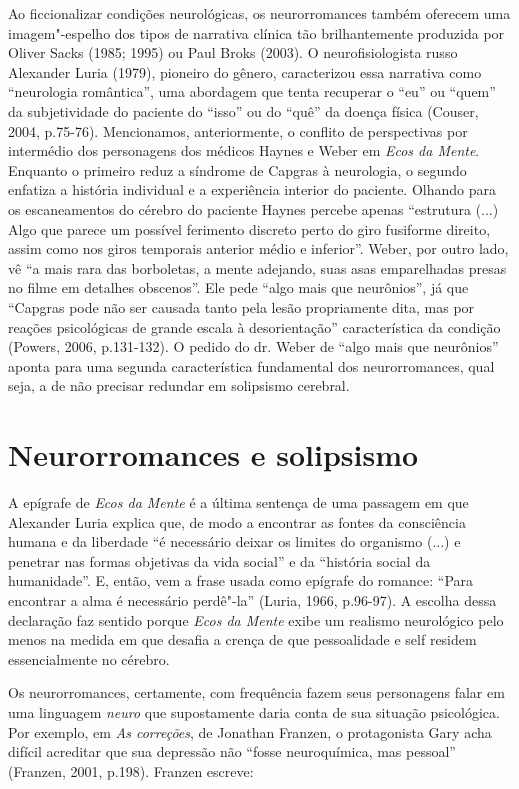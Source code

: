 Ao ficcionalizar condições neurológicas, os neurorromances também
oferecem uma imagem"-espelho dos tipos de narrativa clínica tão
brilhantemente produzida por Oliver Sacks (1985; 1995) ou Paul Broks
(2003). O neurofisiologista russo Alexander Luria (1979), pioneiro do
gênero, caracterizou essa narrativa como ``neurologia romântica'', uma
abordagem que tenta recuperar o ``eu'' ou ``quem'' da subjetividade do
paciente do ``isso'' ou do ``quê'' da doença física (Couser, 2004,
p.75-76). Mencionamos, anteriormente, o conflito de perspectivas por
intermédio dos personagens dos médicos Haynes e Weber em \emph{Ecos da
Mente}. Enquanto o primeiro reduz a síndrome de Capgras à neurologia, o
segundo enfatiza a história individual e a experiência interior do
paciente. Olhando para os escaneamentos do cérebro do paciente Haynes
percebe apenas ``estrutura (...) Algo que parece um possível ferimento
discreto perto do giro fusiforme direito, assim como nos giros temporais
anterior médio e inferior''. Weber, por outro lado, vê ``a mais rara das
borboletas, a mente adejando, suas asas emparelhadas presas no filme em
detalhes obscenos''. Ele pede ``algo mais que neurônios'', já que
``Capgras pode não ser causada tanto pela lesão propriamente dita, mas
por reações psicológicas de grande escala à desorientação''
característica da condição (Powers, 2006, p.131-132). O pedido do dr.
Weber de ``algo mais que neurônios'' aponta para uma segunda
característica fundamental dos neurorromances, qual seja, a de não
precisar redundar em solipsismo cerebral.

\chapter{Neurorromances e solipsismo}

A epígrafe de \emph{Ecos da Mente} é a última sentença de uma passagem
em que Alexander Luria explica que, de modo a encontrar as fontes da
consciência humana e da liberdade ``é necessário deixar os limites do
organismo (...) e penetrar nas formas objetivas da vida social'' e da
``história social da humanidade''. E, então, vem a frase usada como
epígrafe do romance: ``Para encontrar a alma é necessário perdê"-la''
(Luria, 1966, p.96-97). A escolha dessa declaração faz sentido porque
\emph{Ecos da Mente} exibe um realismo neurológico pelo menos na medida
em que desafia a crença de que pessoalidade e self residem
essencialmente no cérebro.

Os neurorromances, certamente, com frequência fazem seus personagens
falar em uma linguagem \emph{neuro} que supostamente daria conta de sua
situação psicológica. Por exemplo, em \emph{As correções}, de Jonathan
Franzen, o protagonista Gary acha difícil acreditar que sua depressão
não ``fosse neuroquímica, mas pessoal'' (Franzen, 2001, p.198). Franzen
escreve:

